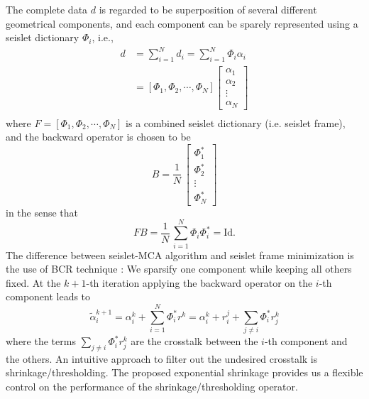 The complete data $d$ is regarded to be superposition of several different geometrical components, and each component can be sparely represented using a seislet dictionary $\Phi_i$, i.e.,
\begin{equation}
\begin{array}{ll}
  d&=\displaystyle \sum_{i=1}^N d_i=\sum_{i=1}^N \Phi_i \alpha_i\\
  &=[\Phi_1,\Phi_2,\cdots,\Phi_N]\left[\begin{array}{l}
                                        \alpha_1\\
                                        \alpha_2\\
                                        \vdots\\
                                        \alpha_N
                                       \end{array}
\right]\\
\end{array}
\end{equation}
where $F=[\Phi_1,\Phi_2,\cdots,\Phi_N]$ is a combined seislet dictionary (i.e. seislet frame), and the backward operator is chosen to be
\begin{equation}
 B=\frac{1}{N}\,\left[\begin{array}{l}
                \Phi_1^{*}\\
		\Phi_2^{*}\\
                \vdots\\
                \Phi_N^{*}
   \end{array} \right]
\end{equation}
in the sense that
\begin{equation}
 FB=\displaystyle \frac{1}{N}\,\sum_{i=1}^N\Phi_i\Phi_i^{*}=\mathrm{Id}.
\end{equation}
The difference between seislet-MCA algorithm and seislet frame minimization is the use of BCR technique \citep{bruce1998block}: We sparsify one component while keeping all others fixed.  At the $k+1$-th iteration applying the backward operator on the $i$-th component leads to
\begin{equation}
\tilde{\alpha}_i^{k+1}=\alpha_i^k+\sum_{i=1}^N\Phi_i^{*} r^k=\alpha_i^k+r_i^j+\sum_{j\neq i}\Phi_i^{*} r_j^k
\end{equation}
where the terms $\sum_{j\neq i}\Phi_i^{*}r_j^k$ are the crosstalk between the $i$-th component and the others. An intuitive approach to filter out the undesired crosstalk is shrinkage/thresholding. The proposed exponential shrinkage provides us a flexible control on the performance of the shrinkage/thresholding operator.



